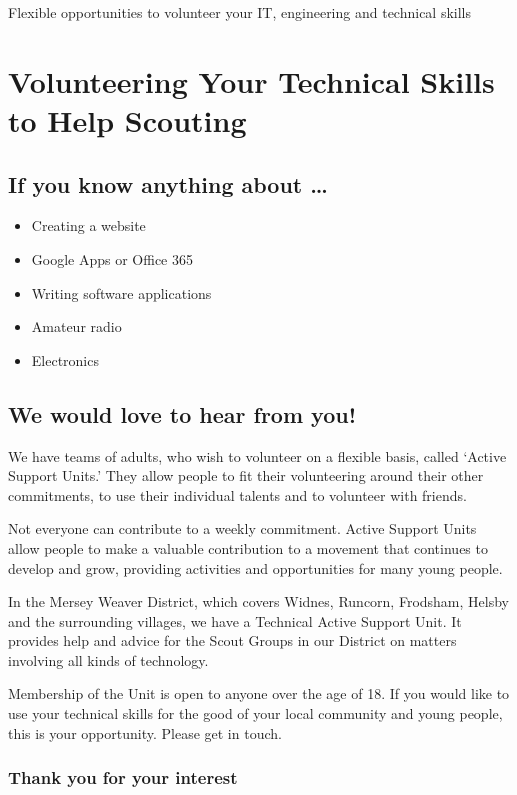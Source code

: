 \documentclass[12pt,foldmark]{leaflet}
\begin{document}
{Flexible opportunities to volunteer your IT, engineering and technical skills}

\withrotationtrue
\section{Volunteering Your Technical Skills to Help Scouting}
\withrotationfalse
\subsection{If you know anything about \ldots}
\vspace{1cm}
\begin{itemize}
    \item Creating a website
    \item Google Apps or Office 365
    \item Writing software applications
    \item Amateur radio
    \item Electronics
\end{itemize}
\vspace{1cm}
\subsection{We would love to hear from you!}
\newpage

We have teams of adults, who wish to volunteer on a flexible basis, called `Active Support Units.' They allow people to fit their volunteering around their other commitments, to use their individual talents and to volunteer with friends.

Not everyone can contribute to a weekly commitment. Active Support Units allow people to make a valuable contribution to a movement that continues to develop and grow, providing activities and opportunities for many young people.

In the Mersey Weaver District, which covers Widnes, Runcorn, Frodsham, Helsby and the surrounding villages, we have a Technical Active Support Unit. It provides help and advice for the Scout Groups in our District on matters involving all kinds of technology.

Membership of the Unit is open to anyone over the age of 18. If you would like to use your technical skills for the good of your local community and young people, this is your opportunity. Please get in touch.
\vfill
\subsubsection{Thank you for your interest}
\newpage
\end{document}
